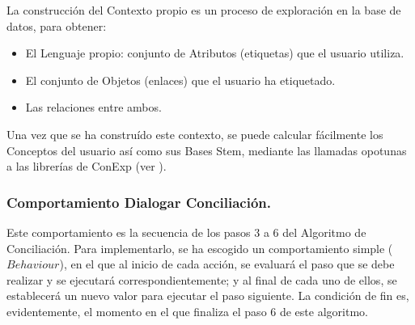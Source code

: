 La construcción del Contexto propio es un proceso de exploración en la base de datos, para obtener:

\begin{itemize}
	\item El Lenguaje propio: conjunto de Atributos (etiquetas) que el usuario utiliza.
	\item El conjunto de Objetos (enlaces) que el usuario ha etiquetado.
	\item Las relaciones entre ambos.
\end{itemize}

Una vez que se ha construído este contexto, se puede calcular fácilmente los Conceptos del usuario así como sus Bases Stem, mediante las llamadas opotunas a las librerías de ConExp (ver \cite{conexp}).




\subsubsection{Comportamiento Dialogar Conciliación.}

Este comportamiento es la secuencia de los pasos 3 a 6 del Algoritmo de Conciliación. Para implementarlo, se ha escogido un comportamiento simple ($Behaviour$), en el que al inicio de cada acción, se evaluará el paso que se debe realizar y se ejecutará correspondientemente; y al final de cada uno de ellos, se establecerá un nuevo valor para ejecutar el paso siguiente. La condición de fin es, evidentemente, el momento en el que finaliza el paso 6 de este algoritmo.

